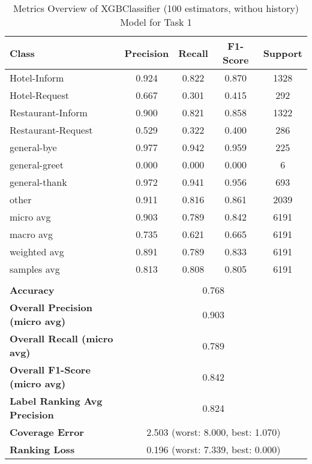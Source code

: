 
\begin{table}[h]
\centering

\begin{tabular}{|l|c|c|c|c|}
\hline
\textbf{Class}& \textbf{Precision} & \textbf{Recall} & \textbf{F1-Score} & \textbf{Support} \\ \hline
Hotel-Inform & 0.924 & 0.822 & 0.870 & 1328 \\ \hline
Hotel-Request & 0.667 & 0.301 & 0.415 & 292 \\ \hline
Restaurant-Inform & 0.900 & 0.821 & 0.858 & 1322 \\ \hline
Restaurant-Request & 0.529 & 0.322 & 0.400 & 286 \\ \hline
general-bye & 0.977 & 0.942 & 0.959 & 225 \\ \hline
general-greet & 0.000 & 0.000 & 0.000 & 6 \\ \hline
general-thank & 0.972 & 0.941 & 0.956 & 693 \\ \hline
other & 0.911 & 0.816 & 0.861 & 2039 \\ \hline\hline
micro avg & 0.903 & 0.789 & 0.842 & 6191 \\ \hline
macro avg & 0.735 & 0.621 & 0.665 & 6191 \\ \hline
weighted avg & 0.891 & 0.789 & 0.833 & 6191 \\ \hline
samples avg & 0.813 & 0.808 & 0.805 & 6191 \\ \hline
\multicolumn{5}{c}{}\\ \hline

\textbf{Accuracy}                    & \multicolumn{4}{c|}{0.768}                                 \\ \hline
\textbf{Overall Precision (micro avg)}           & \multicolumn{4}{c|}{0.903}                                \\ \hline
\textbf{Overall Recall (micro avg)}              & \multicolumn{4}{c|}{0.789}                                   \\ \hline
\textbf{Overall F1-Score (micro avg)}            & \multicolumn{4}{c|}{0.842}                                  \\ \hline
\textbf{Label Ranking Avg Precision} & \multicolumn{4}{c|}{0.824}                                    \\ \hline
\textbf{Coverage Error}              & \multicolumn{4}{c|}{2.503 (worst: 8.000, best: 1.070)}                             \\ \hline
\textbf{Ranking Loss}                & \multicolumn{4}{c|}{0.196 (worst: 7.339, best: 0.000)}                             \\ \hline
\end{tabular}

\caption{Metrics Overview of XGBClassifier (100 estimators, withou history) Model for Task 1}
\label{table:XGBClassifier (100 estimators, withou history)_metrics_task_1}
\end{table}
    